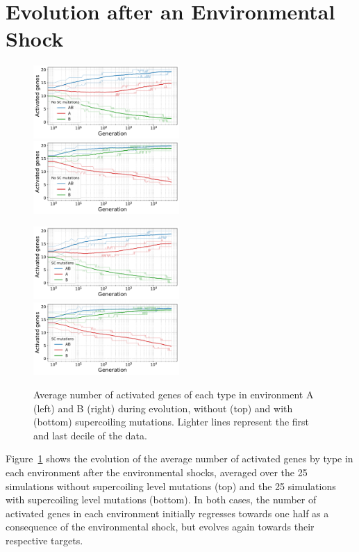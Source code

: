 \section{Evolution after an Environmental Shock}

\begin{figure}[H]
\centering
\includegraphics[width=0.495\textwidth]{epistasis/img/control/gene_activity_env_A.pdf}
\includegraphics[width=0.495\textwidth]{epistasis/img/control/gene_activity_env_B.pdf}

\includegraphics[width=0.495\textwidth]{epistasis/img/with-sc/gene_activity_env_A.pdf}
\includegraphics[width=0.495\textwidth]{epistasis/img/with-sc/gene_activity_env_B.pdf}
\caption[Evolution of the number of activated genes in each environment, with a]{Average number of activated genes of each type in environment A (left) and B (right) during evolution, without (top) and with (bottom) supercoiling mutations.
Lighter lines represent the first and last decile of the data.}
\label{fig:epistasis:activ-by-env}
\end{figure}

Figure~\ref{fig:epistasis:activ-by-env} shows the evolution of the average number of activated genes by type in each environment after the environmental shocks, averaged over the 25 simulations without supercoiling level mutations (top) and the 25 simulations with supercoiling level mutations (bottom).
In both cases, the number of activated genes in each environment initially regresses towards one half as a consequence of the environmental shock, but evolves again towards their respective targets.

